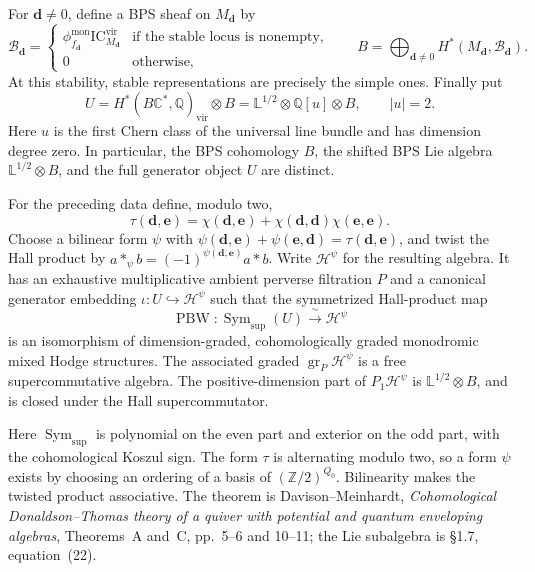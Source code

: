 For $\mathbf d\ne0$, define a BPS sheaf on $M_{\mathbf d}$ by
\[
 \mathcal B_{\mathbf d}=
 \begin{cases}
 \phi_{f_{\mathbf d}}^{\mathrm{mon}}
       \mathrm{IC}_{M_{\mathbf d}}^{\mathrm{vir}}
       &\text{if the stable locus is nonempty},\\
 0&\text{otherwise},
 \end{cases}
 \qquad
 B=\bigoplus_{\mathbf d\ne0}H^*(M_{\mathbf d},\mathcal B_{\mathbf d}).
\]
At this stability, stable representations are precisely the simple
ones. Finally put
\[
 U=H^*(B\mathbb C^*,\mathbb Q)_{\mathrm{vir}}\otimes B
   =\mathbb L^{1/2}\otimes\mathbb Q[u]\otimes B,
 \qquad |u|=2.
\]
Here $u$ is the first Chern class of the universal line bundle and
has dimension degree zero. In particular, the BPS
cohomology $B$, the shifted BPS Lie algebra $\mathbb L^{1/2}\otimes B$,
and the full generator object $U$ are distinct.

\begin{theorem}
\label{v4-arith:thm:davison-integrality}
\ClaimStatusProvedElsewhere{}
For the preceding data define, modulo two,
\[
 \tau(\mathbf d,\mathbf e)=\chi(\mathbf d,\mathbf e)
       +\chi(\mathbf d,\mathbf d)\chi(\mathbf e,\mathbf e).
\]
Choose a bilinear form $\psi$ with
$\psi(\mathbf d,\mathbf e)+\psi(\mathbf e,\mathbf d)
=\tau(\mathbf d,\mathbf e)$, and twist the Hall product by
$a*_\psi b=(-1)^{\psi(\mathbf d,\mathbf e)}a*b$.
Write $\mathcal H^\psi$ for the resulting algebra. It has an
exhaustive multiplicative ambient perverse filtration $P$ and a
canonical generator embedding $\iota:U\hookrightarrow\mathcal H^\psi$
such that the symmetrized Hall-product map
\begin{equation}
 \operatorname{PBW}:\operatorname{Sym}_{\mathrm{sup}}(U)
       \xrightarrow{\ \sim\ }\mathcal H^\psi
 \label{v4-arith:ks:pbw-object-map}
\end{equation}
is an isomorphism of dimension-graded, cohomologically graded
monodromic mixed Hodge structures. The associated graded
$\operatorname{gr}_P\mathcal H^\psi$ is a free supercommutative
algebra. The positive-dimension part of $P_1\mathcal H^\psi$ is
$\mathbb L^{1/2}\otimes B$, and is closed under the Hall
supercommutator.
\end{theorem}

Here $\operatorname{Sym}_{\mathrm{sup}}$ is polynomial on the even
part and exterior on the odd part, with the cohomological Koszul sign.
The form $\tau$ is alternating modulo two, so a form $\psi$ exists
by choosing an ordering of a basis of $(\mathbb Z/2)^{Q_0}$.
Bilinearity makes the twisted product associative. The theorem is
Davison--Meinhardt, \emph{Cohomological Donaldson--Thomas theory of
a quiver with potential and quantum enveloping algebras},
Theorems~A and~C, pp.~5--6 and 10--11; the Lie subalgebra is
\S1.7, equation~(22).

